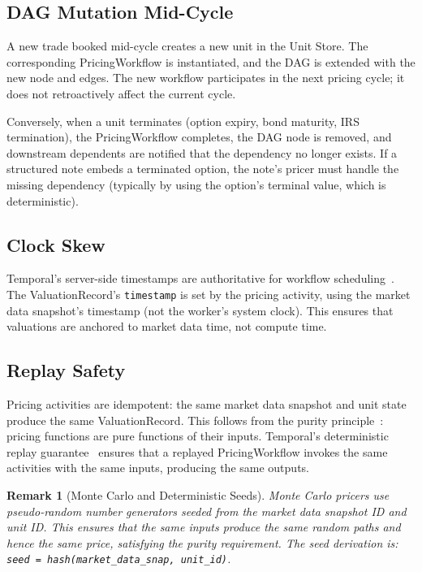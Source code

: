 \documentclass[11pt,a4paper]{article}
\newtheorem{remark}[definition]{Remark}
\begin{document}
\subsection{DAG Mutation Mid-Cycle}

A new trade booked mid-cycle creates a new unit in the Unit Store.  The corresponding PricingWorkflow is instantiated, and the DAG is extended with the new node and edges.  The new workflow participates in the next pricing cycle; it does not retroactively affect the current cycle.

Conversely, when a unit terminates (option expiry, bond maturity, IRS termination), the PricingWorkflow completes, the DAG node is removed, and downstream dependents are notified that the dependency no longer exists.  If a structured note embeds a terminated option, the note's pricer must handle the missing dependency (typically by using the option's terminal value, which is deterministic).

\subsection{Clock Skew}

Temporal's server-side timestamps are authoritative for workflow scheduling~\cite[\S14]{ledger}.  The ValuationRecord's \texttt{timestamp} is set by the pricing activity, using the market data snapshot's timestamp (not the worker's system clock).  This ensures that valuations are anchored to market data time, not compute time.

\subsection{Replay Safety}

Pricing activities are idempotent: the same market data snapshot and unit state produce the same ValuationRecord.  This follows from the purity principle~\cite[\S7.7]{ledger}: pricing functions are pure functions of their inputs.  Temporal's deterministic replay guarantee~\cite[\S14.1]{ledger} ensures that a replayed PricingWorkflow invokes the same activities with the same inputs, producing the same outputs.

\begin{remark}[Monte Carlo and Deterministic Seeds]
Monte Carlo pricers use pseudo-random number generators seeded from the market data snapshot ID and unit ID.  This ensures that the same inputs produce the same random paths and hence the same price, satisfying the purity requirement.  The seed derivation is: \texttt{seed = hash(market\_data\_snap, unit\_id)}.
\end{remark}
\end{document}
